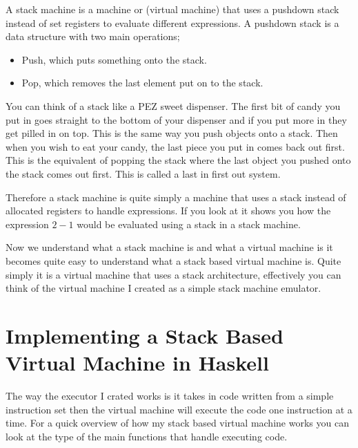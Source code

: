 A stack machine is a machine or (virtual machine) that uses a pushdown stack instead of set registers to evaluate different expressions\footnotemark[3]. A pushdown stack is a data structure with two main operations;

\begin{itemize}
\item Push, which puts something onto the stack.
\item Pop, which removes the last element put on to the stack.
\end{itemize} 

You can think of a stack like a PEZ sweet dispenser. The first bit of candy you put in goes straight to the bottom of your dispenser and if you put more in they get pilled in on top. This is the same way you push objects onto a stack. Then when you wish to eat your candy, the last piece you put in comes back out first. This is the equivalent of popping the stack where the last object you pushed onto the stack comes out first. This is called a last in first out system.    


Therefore a stack machine is quite simply a machine that uses a stack instead of allocated registers to handle expressions. If you look at %
it shows you how the expression $2 - 1$ would be evaluated using a stack in a stack machine.

Now we understand what a stack machine is and what a virtual machine is it becomes quite easy to understand what a stack based virtual machine is. Quite simply it is a virtual machine that uses a stack architecture, effectively you can think of the virtual machine I created as a simple stack machine emulator. 


\section[Implementing a Stack Based Virtual Machine]{Implementing a Stack Based \\ Virtual Machine in Haskell}

The way the executor I crated works is it takes in code written from a simple instruction set then the virtual machine will execute the code one instruction at a time. For a quick overview of how my stack based virtual machine works you can look at the type of the main functions that handle executing code.

